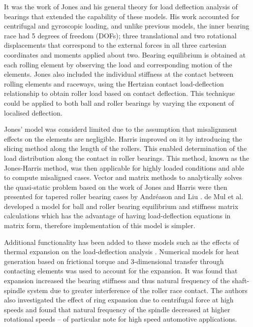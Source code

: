It was the work of Jones \cite{Jones1960} and his general theory for load deflection analysis of bearings that extended the capability of these models. His work accounted for centrifugal and gyroscopic loading, and unlike previous models, the inner bearing race had 5 degrees of freedom (DOFs); three translational and two rotational displacements that correspond to the external forces in all three cartesian coordinates and moments applied about two. Bearing equilibrium is obtained at each rolling element by observing the load and corresponding motion of the elements. Jones also included the individual stiffness at the contact between rolling elements and raceways, using the Hertzian contact load-deflection relationship to obtain roller load based on contact deflection. This technique could be applied to both ball and roller bearings by varying the exponent of localised deflection. 

Jones' model was considerd limited due to the assumption that misalignment effects on the elements are negligible. Harris \cite{Harris1984} improved on it by introducing the slicing method along the length of the rollers. This enabled determination of the load distribution along the contact in roller bearings. This method, known as the Jones-Harris method, was then applicable for highly loaded conditions and able to compute misaligned cases. Vector and matrix methods to analytically solves the quasi-static problem based on the work of Jones and Harris were then presented for tapered roller bearing cases by Andréason \cite{Andreason1973} and Liu \cite{Liu1976}. de Mul et al. \cite{DeMul1989_2} developed a model for ball and roller bearing equilibrium and stiffness matrix calculations which has the advantage of having load-deflection equations in matrix form, therefore implementation of this model is simpler.

Additional functionality has been added to these models such as the effects of thermal expansion on the load-deflection analysis \cite{Jorgensen1997}. Numerical models for heat generation based on frictional torque and 3-dimensional transfer through contacting elements was used to account for the expansion. It was found that expansion increased the bearing stiffness and thus natural frequency of the shaft-spindle system due to greater interference of the roller race contact. The authors also investigated the effect of ring expansion due to centrifugal force at high speeds \cite{Jorgensen1998} and found that natural frequency of the spindle decreased at higher rotational speeds – of particular note for high speed automotive applications.

